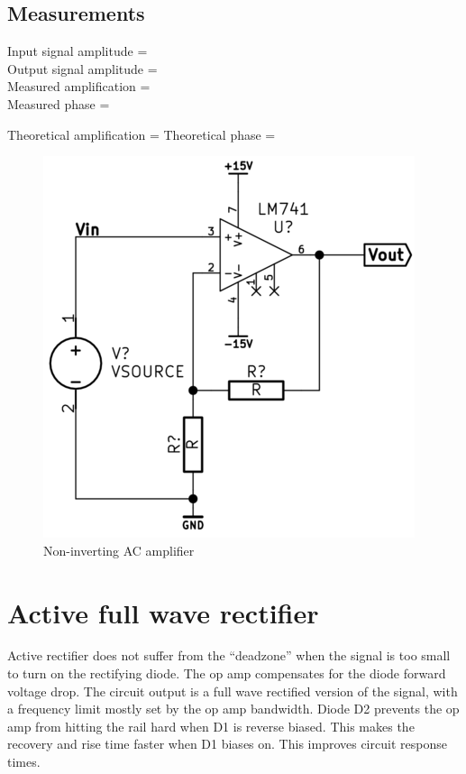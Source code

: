 \documentclass[]{article}
\begin{document}
\subsection{Measurements}\label{measurements-3}

Input signal amplitude =\\Output signal amplitude =\\Measured
amplification =\\Measured phase =

Theoretical amplification = Theoretical phase =

\begin{figure}[htbp]
\centering
\includegraphics{img/noninvACamp.png}
\caption{Non-inverting AC amplifier}
\end{figure}

\section{Active full wave rectifier}\label{active-full-wave-rectifier}

Active rectifier does not suffer from the ``deadzone'' when the signal
is too small to turn on the rectifying diode. The op amp compensates for
the diode forward voltage drop. The circuit output is a full wave
rectified version of the signal, with a frequency limit mostly set by
the op amp bandwidth. Diode D2 prevents the op amp from hitting the rail
hard when D1 is reverse biased. This makes the recovery and rise time
faster when D1 biases on. This improves circuit response times.
\end{document}
